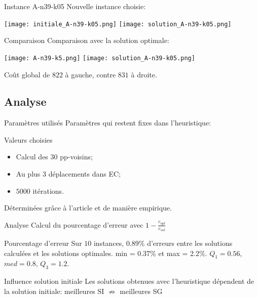 \documentclass{beamer}
\begin{document}
\begin{frame}{Instance A-n39-k05}
Nouvelle instance choisie:
\begin{center}
\texttt{[image: initiale\_A-n39-k05.png]}
\texttt{[image: solution\_A-n39-k05.png]}
\end{center}

\end{frame}

\begin{frame}{Comparaison}
Comparaison avec la solution optimale:
\begin{center}
\texttt{[image: A-n39-k5.png]}
\texttt{[image: solution\_A-n39-k05.png]}
\end{center}
Coût global de $822$ à gauche, contre $831$ à droite.
\end{frame}

\subsection{Analyse}

\begin{frame}{Paramètres utilisés}
Paramètres qui restent fixes dans l'heuristique:
\begin{block}{Valeurs choisies}
\begin{itemize}
\item Calcul des 30 pp-voisins;
\item Au plus 3 déplacements dans EC;
\item $5000$ itérations.
\end{itemize}
\end{block}
Déterminées grâce à l'article et de manière empirique.
\end{frame}

\begin{frame}{Analyse}
Calcul du pourcentage d'erreur avec $1-\frac{c_{opt}}{c_{sol}}$
\begin{exampleblock}{Pourcentage d'erreur}
Sur $10$ instances, $0.89\%$ d'erreurs entre les solutions calculées et les solutions optimales. min = 0.37\% et max = 2.2\%. $Q_1 = 0.56$, $ med = 0.8$, $Q_3 = 1.2$. 
\end{exampleblock}

\begin{alertblock}{Influence solution initiale}
Les solutions obtenues avec l'heuristique dépendent de la solution initiale: meilleures SI $\nRightarrow$ meilleures SG %
\end{alertblock}

\end{frame}
\end{document}
